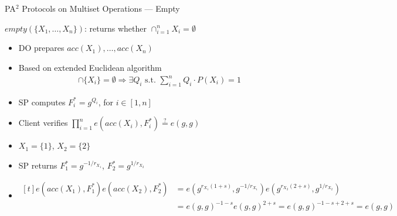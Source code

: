 \documentclass[xcolor={dvipsnames},aspectratio=169,10pt]{beamer}
\begin{document}
\begin{frame}{PA$^2$ Protocols on Multiset Operations --- Empty}
  \begin{block}{$empty(\{X_1, \dotsc, X_n\})$: returns whether $\cap_{i=1}^n X_i = \emptyset$}
    \begin{itemize}
      \item DO prepares $acc(X_1), \dotsc, acc(X_n)$
      \item Based on \alert{extended Euclidean algorithm}
        \begin{align*}
          \textstyle%
          \cap \{ X_i \} = \emptyset \Rightarrow \exists Q_i \text{ s.t. } \sum_{i=1}^n Q_i \cdot P(X_i) = 1
        \end{align*}
      \item SP computes $F_i^* = g^{Q_i}$, for $i \in [1, n]$
      \item Client verifies $\prod_{i=1}^n e(acc(X_i), F_i^*) \stackrel{?}{=} e(g, g)$
    \end{itemize}
  \end{block}
  \begin{example}
    \begin{itemize}
      \item $X_1 = \{ 1 \}$, $X_2 = \{ 2 \}$
      \item SP returns $F_1^* = g^{-1/r_{X_1}}$, $F_2^* = g^{1/r_{X_2}}$
      \item \(
        \begin{aligned}[t]
          e(acc(X_1), F_1^*)e(acc(X_2), F_2^*) &= e(g^{r_{X_1}(1+s)}, g^{-1/r_{X_1}})e(g^{r_{X_2}(2+s)}, g^{1/r_{X_2}}) \\
                                               &= {e(g,g)}^{-1-s}{e(g,g)}^{2+s} = {e(g,g)}^{-1-s+2+s} = e(g,g)
        \end{aligned}
        \)
    \end{itemize}
  \end{example}
\end{frame}
\end{document}
